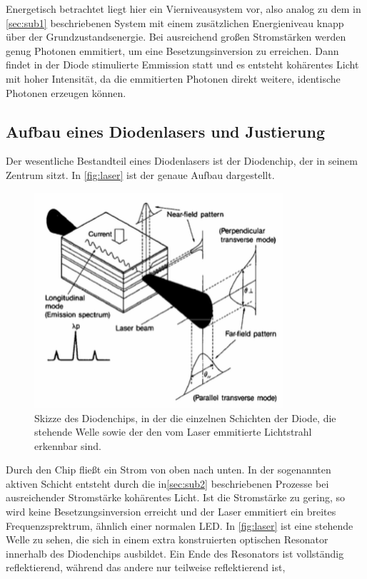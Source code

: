 Energetisch betrachtet liegt hier ein Vierniveausystem vor, also analog zu dem in \autoref{sec:sub1} beschriebenen System mit einem
zusätzlichen Energieniveau knapp über der Grundzustandsenergie. Bei ausreichend großen Stromstärken werden genug Photonen emmitiert, um eine Besetzungsinversion
zu erreichen. Dann findet in der Diode stimulierte Emmission statt und es entsteht kohärentes Licht mit hoher Intensität, da die
emmitierten Photonen direkt weitere, identische Photonen erzeugen können.

\subsection{Aufbau eines Diodenlasers und Justierung}

Der wesentliche Bestandteil eines Diodenlasers ist der Diodenchip, der in seinem Zentrum sitzt.
In \autoref{fig:laser} ist der genaue Aufbau dargestellt.
\begin{figure}[H]
    \centering
    \includegraphics[height=8cm]{content/pics/laser.png}
    \caption{Skizze des Diodenchips, in der die einzelnen Schichten der Diode, die stehende Welle sowie
    der den vom Laser emmitierte Lichtstrahl erkennbar sind. \cite{V60}}
    \label{fig:laser}
\end{figure}
Durch den Chip fließt ein Strom von oben nach unten. In der sogenannten aktiven Schicht entsteht durch die in\autoref{sec:sub2} beschriebenen
Prozesse bei ausreichender Stromstärke kohärentes Licht.
Ist die Stromstärke zu gering, so wird keine Besetzungsinversion erreicht und der Laser emmitiert ein breites Frequenzsprektrum, ähnlich
einer normalen LED.
In \autoref{fig:laser} ist eine stehende Welle zu sehen, die sich in einem extra konstruierten optischen Resonator innerhalb
des Diodenchips ausbildet. Ein Ende des Resonators ist vollständig reflektierend, während das andere nur teilweise reflektierend ist,
